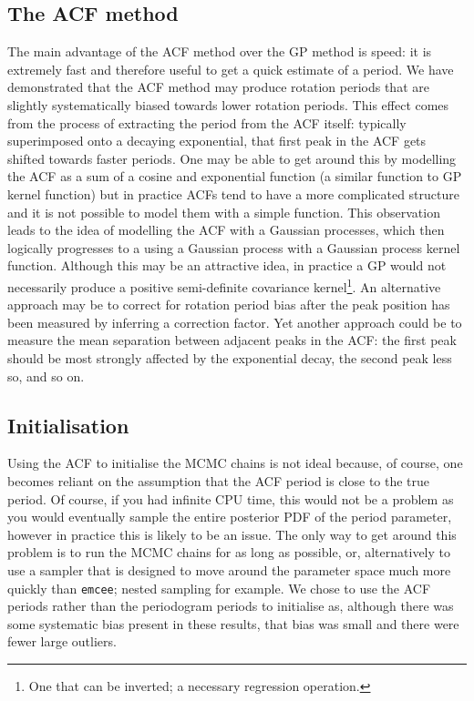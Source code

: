 \documentclass[useAMS, usenatbib, preprint, 12pt]{aastex}
\begin{document}
\subsection{The ACF method}
The main advantage of the ACF method over the GP method is speed: it is
extremely fast and therefore useful to get a quick estimate of a period.
We have demonstrated that the ACF method may produce rotation periods that are
slightly systematically biased towards lower rotation periods.
This effect comes from the process of extracting the period from the ACF
itself: typically superimposed onto a decaying exponential, that first peak in
the ACF gets shifted towards faster periods.
One may be able to get around this by modelling the ACF as a sum of a cosine
and exponential function (a similar function to GP kernel function) but
in practice ACFs tend to have a more complicated structure and it is not
possible to model them with a simple function.
This observation leads to the idea of modelling the ACF with a Gaussian
processes, which then logically progresses to a using a Gaussian process with
a Gaussian process kernel function.
Although this may be an attractive idea, in practice a GP would not
necessarily produce a positive semi-definite covariance kernel\footnote{One
that can be inverted; a necessary regression operation.}.
An alternative approach may be to correct for rotation period bias after the
peak position has been measured by inferring a correction factor.
Yet another approach could be to measure the mean separation between adjacent
peaks in the ACF: the first peak should be most strongly affected by the
exponential decay, the second peak less so, and so on.

\subsection{Initialisation}
Using the ACF to initialise the MCMC chains is not ideal because, of course,
one becomes reliant on the assumption that the ACF period is close to the true
period.
Of course, if you had infinite CPU time, this would not be a problem as you
would eventually sample the entire posterior PDF of the period parameter,
however in practice this is likely to be an issue.
The only way to get around this problem is to run the MCMC chains for as long
as possible, or, alternatively to use a sampler that is designed to move
around the parameter space much more quickly than {\tt emcee}; nested sampling
for example.
We chose to use the ACF periods rather than the periodogram periods to
initialise as, although there was some systematic bias present in these
results, that bias was small and there were fewer large outliers.
\end{document}

